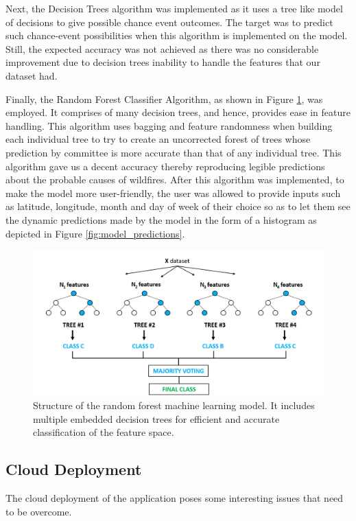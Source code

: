 \documentclass[conference]{IEEEtran}
\begin{document}
Next, the Decision Trees algorithm was implemented as it uses a tree like model of decisions to give possible chance event outcomes. The target was to predict such chance-event possibilities when this algorithm is implemented on the model. Still, the expected accuracy was not achieved as there was no considerable improvement due to decision trees inability to handle the features that our dataset had. \par

Finally, the Random Forest Classifier Algorithm, as shown in Figure \ref{fig:random_forest}, was employed. It comprises of many decision trees, and hence, provides ease in feature handling. This algorithm uses bagging and feature randomness when building each individual tree to try to create an uncorrected forest of trees whose prediction by committee is more accurate than that of any individual tree. This algorithm gave us a decent accuracy thereby reproducing legible predictions about the probable causes of wildfires. After this algorithm was implemented, to make the model more user-friendly, the user was allowed to provide inputs such as latitude, longitude, month and day of week of their choice so as to let them see the dynamic predictions made by the model in the form of a histogram as depicted in Figure \ref{fig:model_predictions}.

\begin{figure}
    \centering
    \includegraphics[scale=0.55]{img/random_forest.PNG}
    \caption{Structure of the random forest machine learning model. It includes multiple embedded decision trees for efficient and accurate classification of the feature space.}
    \label{fig:random_forest}
\end{figure}

\subsection{Cloud Deployment}
The cloud deployment of the application poses some interesting issues that need to be overcome. \par
\end{document}
